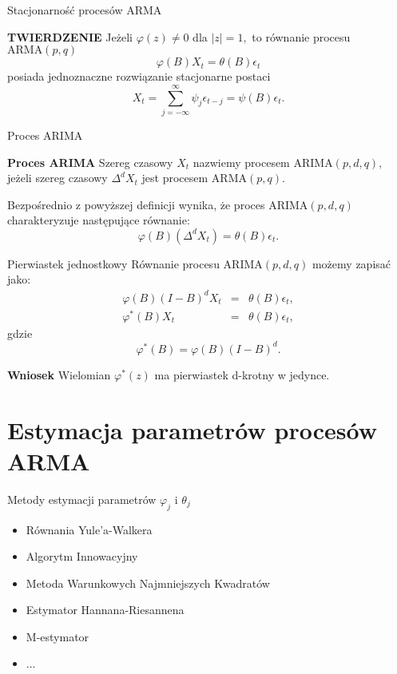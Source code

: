 \documentclass[a4paper, 11pt]{beamer}
\begin{document}
	\begin{frame}{Stacjonarność procesów ARMA}
		\begin{block}{\textbf{TWIERDZENIE}}
			Jeżeli $\varphi\left(z\right) \neq 0$ dla $\left|z\right| = 1,$ to równanie procesu $\mbox{ARMA}\left(p, q\right)$ \[
				\varphi\left(B\right) X_t = \theta\left(B\right) \epsilon_{t}
			\] posiada jednoznaczne rozwiązanie stacjonarne postaci \[
				X_t = \sum_{j=-\infty}^{\infty} \psi_{j} \epsilon_{t - j} = \psi\left(B\right) \epsilon_{t}.
			\]
		\end{block}
	\end{frame}
	
	\begin{frame}{Proces ARIMA}
		\begin{block}{\textbf{Proces ARIMA}}
			Szereg czasowy $X_t$ nazwiemy procesem $\mbox{ARIMA}\left(p, d, q\right),$ jeżeli
			szereg czasowy $\Delta^{d} X_t$ jest procesem $\mbox{ARMA}\left(p, q\right).$
		\end{block}
		Bezpośrednio z powyższej definicji wynika, że proces $\mbox{ARIMA}\left(p, d, q\right)$ charakteryzuje następujące równanie: \[
			\varphi\left(B\right)\left(\Delta^{d} X_{t}\right) = \theta\left(B\right) \epsilon_{t}.
		\]
	\end{frame}
	
	\begin{frame}{Pierwiastek jednostkowy}
		Równanie procesu $\mbox{ARIMA}\left(p, d, q\right)$ możemy zapisać jako: \begin{eqnarray*}
			\varphi\left(B\right)\left(I - B\right)^{d} X_{t} & = & \theta\left(B\right) \epsilon_{t},\\
			\varphi^{*}\left(B\right) X_{t} & = & \theta\left(B\right) \epsilon_{t},
		\end{eqnarray*} gdzie \[
			\varphi^{*}\left(B\right) = \varphi\left(B\right)\left(I - B\right)^{d}.
		\]
		\begin{alert}{\textbf{Wniosek}}
			Wielomian $\varphi^{*}\left(z\right)$ ma pierwiastek d-krotny w jedynce.
		\end{alert}
	\end{frame}
	
	\section{Estymacja parametrów procesów ARMA}
	
	\begin{frame}{Metody estymacji parametrów $\varphi_{j}$ i $\theta_{j}$}
		\begin{itemize}
			\item Równania Yule'a-Walkera
			\item Algorytm Innowacyjny
			\item Metoda Warunkowych Najmniejszych Kwadratów
			\item Estymator Hannana-Riesannena
			\item M-estymator
			\item ...
		\end{itemize}
	\end{frame}
	
\end{document}
